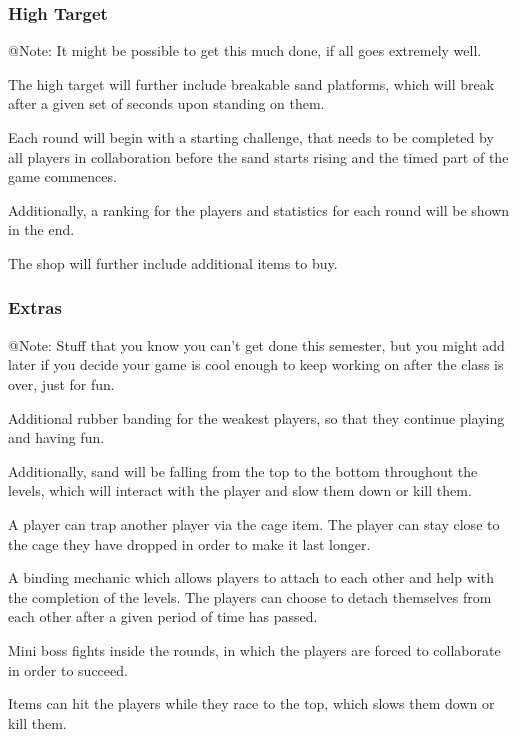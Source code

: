 \subsubsection{High Target}

\begin{TempText}
	@Note: It might be possible to get this much done, if all goes extremely well.
\end{TempText}

The high target will further include breakable sand platforms, which will break after a given set of seconds upon standing on them.

Each round will begin with a starting challenge, that needs to be completed by all players in collaboration before the sand starts rising and the timed part of the game commences.

Additionally, a ranking for the players and statistics for each round will be shown in the end.

The shop will further include additional items to buy.

\subsubsection{Extras}

\begin{TempText}
	@Note: Stuff that you know you can't get done this semester, but you might add later if you decide your game is cool enough to keep working on after the class is over, just for fun.
\end{TempText}

Additional rubber banding for the weakest players, so that they continue playing and having fun.

Additionally, sand will be falling from the top to the bottom throughout the levels, which will interact with the player and slow them down or kill them.

A player can trap another player via the cage item. The player can stay close to the cage they have dropped in order to make it last longer.

A binding mechanic which allows players to attach to each other and help with the completion of the levels. The players can choose to detach themselves from each other after a given period of time has passed.

Mini boss fights inside the rounds, in which the players are forced to collaborate in order to succeed.

Items can hit the players while they race to the top, which slows them down or kill them.

